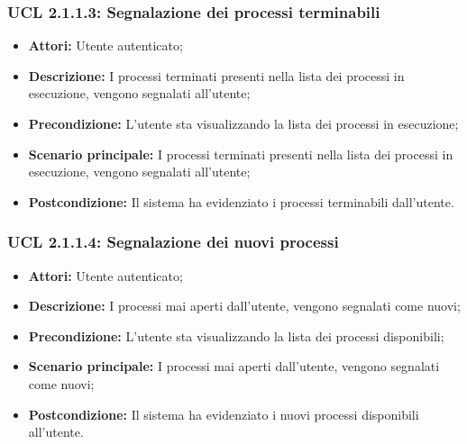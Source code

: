 \hypertarget{L2.1.1.3}{}
\subsubsection{UCL 2.1.1.3: Segnalazione dei processi terminabili}
\begin{itemize}
\item \textbf{Attori:} Utente autenticato;
\item \textbf{Descrizione:} I processi terminati presenti nella lista dei processi in esecuzione, vengono segnalati all'utente;
\item \textbf{Precondizione:} L'utente sta visualizzando la lista dei processi in esecuzione;
\item \textbf{Scenario principale:} I processi terminati presenti nella lista dei processi in esecuzione, vengono segnalati all'utente;
\item \textbf{Postcondizione:} Il sistema ha evidenziato i processi terminabili dall'utente.
\end{itemize}

\hypertarget{L2.1.1.4}{}
\subsubsection{UCL 2.1.1.4: Segnalazione dei nuovi processi}
\begin{itemize}
\item \textbf{Attori:} Utente autenticato;
\item \textbf{Descrizione:} I processi mai aperti dall'utente, vengono segnalati come nuovi;
\item \textbf{Precondizione:} L'utente sta visualizzando la lista dei processi disponibili;
\item \textbf{Scenario principale:} I processi mai aperti dall'utente, vengono segnalati come nuovi;
\item \textbf{Postcondizione:} Il sistema ha evidenziato i nuovi processi disponibili all'utente.
\end{itemize}

